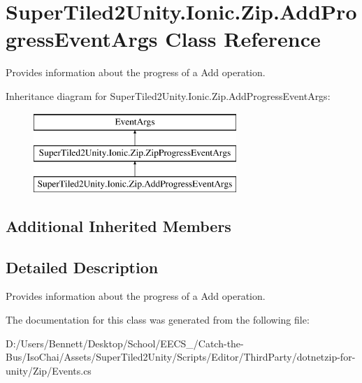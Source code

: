 \hypertarget{class_super_tiled2_unity_1_1_ionic_1_1_zip_1_1_add_progress_event_args}{}\section{Super\+Tiled2\+Unity.\+Ionic.\+Zip.\+Add\+Progress\+Event\+Args Class Reference}
\label{class_super_tiled2_unity_1_1_ionic_1_1_zip_1_1_add_progress_event_args}


Provides information about the progress of a Add operation.  


Inheritance diagram for Super\+Tiled2\+Unity.\+Ionic.\+Zip.\+Add\+Progress\+Event\+Args\+:\begin{figure}[H]
\begin{center}
\leavevmode
\includegraphics[height=3.000000cm]{class_super_tiled2_unity_1_1_ionic_1_1_zip_1_1_add_progress_event_args}
\end{center}
\end{figure}
\subsection*{Additional Inherited Members}


\subsection{Detailed Description}
Provides information about the progress of a Add operation. 



The documentation for this class was generated from the following file\+:\begin{DoxyCompactItemize}
\item 
D\+:/\+Users/\+Bennett/\+Desktop/\+School/\+E\+E\+C\+S\+\_/\+Catch-\/the-\/\+Bus/\+Iso\+Chai/\+Assets/\+Super\+Tiled2\+Unity/\+Scripts/\+Editor/\+Third\+Party/dotnetzip-\/for-\/unity/\+Zip/Events.\+cs\end{DoxyCompactItemize}
